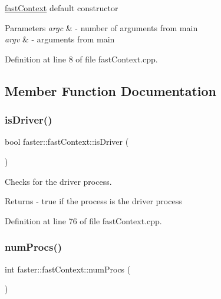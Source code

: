 \hyperlink{classfaster_1_1fastContext}{fast\+Context} default constructor 


\begin{DoxyParams}{Parameters}
{\em argc} & -\/ number of arguments from main \\
\hline
{\em argv} & -\/ arguments from main \\
\hline
\end{DoxyParams}


Definition at line 8 of file fast\+Context.\+cpp.



\subsection{Member Function Documentation}
\hypertarget{classfaster_1_1fastContext_a4c4b1bc0cfe9f4e4a7959cc176d2ec24}{}\label{classfaster_1_1fastContext_a4c4b1bc0cfe9f4e4a7959cc176d2ec24} 
\subsubsection{\texorpdfstring{is\+Driver()}{isDriver()}}
{\footnotesize\ttfamily bool faster\+::fast\+Context\+::is\+Driver (\begin{DoxyParamCaption}{ }\end{DoxyParamCaption})}



Checks for the driver process. 

\begin{DoxyReturn}{Returns}
-\/ true if the process is the driver process 
\end{DoxyReturn}


Definition at line 76 of file fast\+Context.\+cpp.

\hypertarget{classfaster_1_1fastContext_a287bc160898c677df176de122d9dfad9}{}\label{classfaster_1_1fastContext_a287bc160898c677df176de122d9dfad9} 
\subsubsection{\texorpdfstring{num\+Procs()}{numProcs()}}
{\footnotesize\ttfamily int faster\+::fast\+Context\+::num\+Procs (\begin{DoxyParamCaption}{ }\end{DoxyParamCaption})\hspace{0.3cm}{\ttfamily [inline]}}



